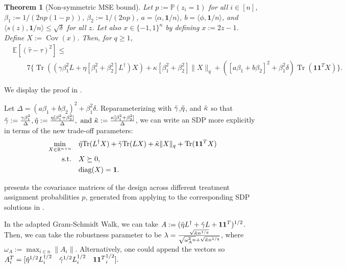 \documentclass[12pt]{article}
\newtheorem{theorem}{Theorem}
\theoremstyle{definition}
\numberwithin{equation}{section}
\numberwithin{figure}{section}
\numberwithin{equation}{section}
\numberwithin{figure}{section}
\begin{document}
\begin{theorem}[Non-symmetric MSE bound] \label{thm:mse_bound_general_HT}
Let $p:= \mathbb{P}(z_i = 1)$ for all $i \in [n]$, $\beta_1 := 1/(2np(1-p))$, $\beta_2 := 1/(2np)$, $a = \langle \alpha, \mathbf{1}/n\rangle$, $b = \langle \phi, \mathbf{1}/n\rangle$, and $\langle s(z), \mathbf{1}/n\rangle \leq \sqrt{\delta}$ for all $z$. Let also $x \in \{-1, 1\}^n$ by defining $x := 2z-1$. Define  $X:=\operatorname{Cov}(x)$. Then, for $q \geq 1$,
     \begin{align*}
          &\mathbb{E}[(\hat{\tau} -\tau)^2] \leq\\
          &\qquad 7 \{ \operatorname{Tr}((\gamma \beta_1^2 L + \eta[\beta_1^2 + \beta_2^2] L^\dagger) X) + \kappa[\beta_1^2 + \beta_2^2] \|X\|_{q} + ([a\beta_1 + b\beta_2]^2 + \beta_1^2 \delta)\operatorname{Tr}(\mathbf{1}\mathbf{1}^TX)\}.
     \end{align*}
\end{theorem}
We display the proof in .

Let $\Delta = (a\beta_1 + b\beta_2)^2 + \beta_1^2 \delta$. Reparameterizing with $\Tilde{\gamma}$,$\Tilde{\eta}$, and $\Tilde{\kappa}$ so that $\Tilde{\gamma} := \frac{\gamma \beta_1^2}{\Delta}, \Tilde{\eta} := \frac{\eta[\beta_1^2 + \beta_2^2]}{\Delta}, \text{ and } \Tilde{\kappa} := \frac{\kappa [\beta_1^2 + \beta_2^2]}{\Delta}$,
we can write an SDP more explicitly in terms of the new trade-off parameters:
\begin{align} \label{sdp_relaxation_mse_p_norm}
    \min_{X\in\mathbb{R}^{n\times n}} \quad & \Tilde{\eta}\text{Tr}(L^\dagger X)  +   \Tilde{\gamma} \text{Tr}(L X) + \Tilde{\kappa} \|X\|_{q} + \operatorname{Tr}(\mathbf{1}\mathbf{1}^TX) \\
    \text{s.t.} \quad & X \succeq  0 \notag,\\
    & \text{diag}(X) = \mathbf{1}. \notag
\end{align}

 presents the covariance matrices of the design across different treatment assignment probabilities $p$, generated from applying  to the corresponding SDP solutions in . 

In the adapted Gram-Schmidt Walk, we can take $A:= (\Tilde{\eta} L^{\dagger} + \Tilde{\gamma} L + \mathbf{1} \mathbf{1}^T)^{1/2}$. Then, we can take the robustness parameter to be $\lambda = \frac{\sqrt{\Tilde{\kappa} n^{1/q}}}{ \sqrt{\omega_A^2n} + \sqrt{\Tilde{\kappa} n^{1/q}}}$, where $\omega_A := \max_{i\in n} \|A_i\|.$
Alternatively, one could append the vectors so $A_i^T = [ \Tilde{\eta}^{1/2} L^{\dagger/2}_i \quad \Tilde{\gamma}^{1/2} L^{1/2}_i \quad {\mathbf{1} \mathbf{1}^T}^{1/2}_i].$ 
\end{document}
